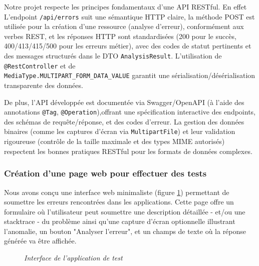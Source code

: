 \documentclass[12pt,a4paper]{report}
\begin{document}
	Notre projet respecte les principes fondamentaux d'une API RESTful. En effet L'endpoint \verb|/api/errors| suit une sémantique HTTP claire, la méthode POST est utilisée pour la création d'une ressource (analyse d'erreur), conformément aux verbes REST, et les réponses HTTP sont standardisées (200 pour le succès, 400/413/415/500 pour les erreurs métier), avec des codes de statut pertinents et des messages structurés dans le DTO \verb|AnalysisResult|. L'utilisation de \verb|@RestController| et de \\ \verb|MediaType.MULTIPART_FORM_DATA_VALUE| garantit une sérialisation/désérialisation transparente des données. \cite{rest}
	
	De plus, l'API développée est documentée via Swagger/OpenAPI (à l'aide des annotations \verb|@Tag|, \verb|@Operation|),offrant une spécification interactive des endpoints, des schémas de requête/réponse, et des codes d'erreur. La gestion des données binaires (comme les captures d'écran via \verb|MultipartFile|) et leur validation rigoureuse (contrôle de la taille maximale et des types MIME autorisés) respectent les bonnes pratiques RESTful pour les formats de données complexes. \cite{swagger}
	
	\subsubsection{Création d'une page web pour effectuer des tests}
	
	Nous avons conçu une interface web minimaliste (figure \ref{fig:interface}) permettant de soumettre les erreurs rencontrées dans les applications. Cette page offre un formulaire où l'utilisateur peut soumettre une description détaillée - et/ou une stacktrace  - du problème ainsi qu’une capture d’écran optionnelle illustrant l’anomalie, un bouton "Analyser l'erreur", et un champs de texte où la réponse générée va être affichée.
	
	\begin{figure}[H]
		\centering
		\caption{\textit{Interface de l'application de test}}
		\label{fig:interface}
	\end{figure}
	
\end{document}
